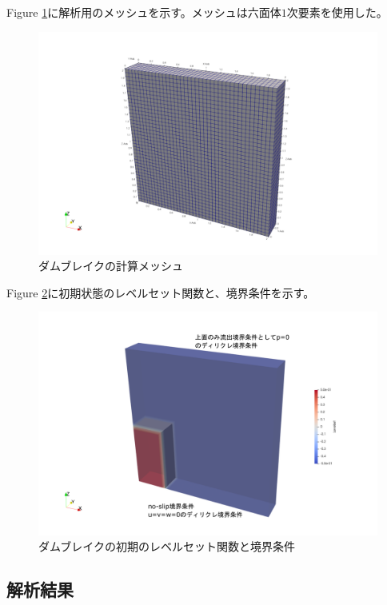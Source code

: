 Figure \ref{fig:3d-dambreak-mesh}に解析用のメッシュを示す。メッシュは六面体$1$次要素を使用した。
\begin{figure}[H]
	\centering
	\includegraphics[width=18truecm]{pics/3d-dambreak/mesh.pdf}
	\caption{ダムブレイクの計算メッシュ}
	\label{fig:3d-dambreak-mesh}
\end{figure}

Figure \ref{fig:3d-dambreak-boundary}に初期状態のレベルセット関数と、境界条件を示す。

\begin{figure}[H]
	\centering
	\includegraphics[width=18truecm]{pics/3d-dambreak/levelset_init.pdf}
	\caption{ダムブレイクの初期のレベルセット関数と境界条件}
	\label{fig:3d-dambreak-boundary}
\end{figure}

\subsection{解析結果}


